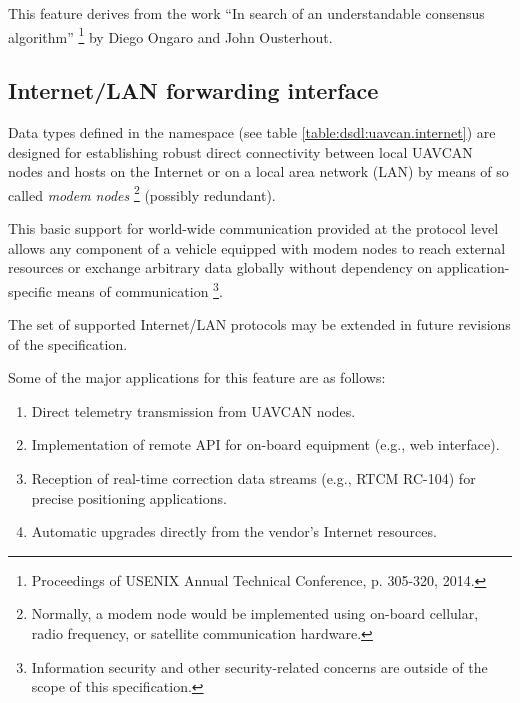 This feature derives from the work
``In search of an understandable consensus algorithm''%
\footnote{Proceedings of USENIX Annual Technical Conference, p. 305-320, 2014.}
by Diego Ongaro and John Ousterhout.


\subsection{Internet/LAN forwarding interface}

Data types defined in the namespace  (see table \ref{table:dsdl:uavcan.internet})
are designed for establishing robust direct connectivity between local UAVCAN nodes and hosts on the Internet
or on a local area network (LAN) by means of so called \emph{modem nodes}%
\footnote{Normally, a modem node would be implemented using on-board cellular, radio frequency,
or satellite communication hardware.}
(possibly redundant).

This basic support for world-wide communication provided at the protocol level allows any component
of a vehicle equipped with modem nodes to reach external resources or exchange arbitrary data globally
without dependency on application-specific means of communication%
\footnote{Information security and other security-related concerns are outside of the scope of this specification.}.

The set of supported Internet/LAN protocols may be extended in future revisions of the specification.

Some of the major applications for this feature are as follows:

\begin{enumerate}
    \item Direct telemetry transmission from UAVCAN nodes.
    \item Implementation of remote API for on-board equipment (e.g., web interface).
    \item Reception of real-time correction data streams (e.g., RTCM RC-104) for precise positioning applications.
    \item Automatic upgrades directly from the vendor's Internet resources.
\end{enumerate}

